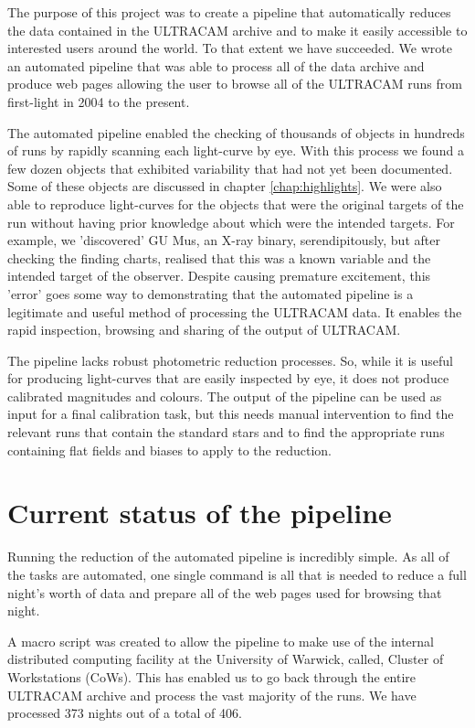 The purpose of this project was to create a pipeline that automatically reduces the data contained in the ULTRACAM archive and to make it easily accessible to interested users around the world. To that extent we have succeeded. We wrote an automated pipeline that was able to process all of the data archive and produce web pages allowing the user to browse all of the ULTRACAM runs from first-light in 2004 to the present. 

The automated pipeline enabled the checking of thousands of objects in hundreds of runs by rapidly scanning each light-curve by eye. With this process we found a few dozen objects that exhibited variability that had not yet been documented. Some of these objects are discussed in chapter \ref{chap:highlights}. We were also able to reproduce light-curves for the objects that were the original targets of the run without having prior knowledge about which were the intended targets. For example, we 'discovered' {GU Mus}, an X-ray binary, serendipitously, but after checking the finding charts, realised that this was a known variable and the intended target of the observer. Despite causing premature excitement, this 'error' goes some way to demonstrating that the automated pipeline is a legitimate and useful method of processing the ULTRACAM data. It enables the rapid inspection, browsing and sharing of the output of ULTRACAM. 

The pipeline lacks robust photometric reduction processes. So, while it is useful for producing light-curves that are easily inspected by eye, it does not produce calibrated magnitudes and colours. The output of the pipeline can be used as input for a final calibration task, but this needs manual intervention to find the relevant runs that contain the standard stars and to find the appropriate runs containing flat fields and biases to apply to the reduction. 

\section{Current status of the pipeline}
Running the reduction of the automated pipeline is incredibly simple. As all of the tasks are automated, one single command is all that is needed to reduce a full night's worth of data and prepare all of the web pages used for browsing that night. 

A macro script was created to allow the pipeline to make use of the internal distributed computing facility at the University of Warwick, called, Cluster of Workstations (CoWs). This has enabled us to go back through the entire ULTRACAM archive and process the vast majority of the runs. We have processed 373 nights out of a total of 406. 

